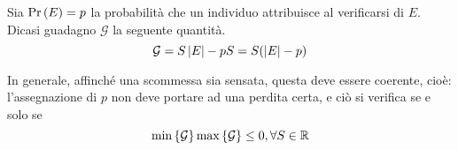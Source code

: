 \documentclass{subfiles}
\begin{document}
\begin{Definition*}
    Sia \(\Prob{E} = p\) la probabilità che un individuo attribuisce al verificarsi di \(E\).
    Dicasi guadagno \(\mathcal{G}\) la seguente quantità.
    \[
        \mathcal{G} = S \left\vert {E} \right\vert - pS = S(\left\vert {E} \right\vert - p)
    \]
\end{Definition*}
In generale, affinché una scommessa sia sensata, questa deve essere coerente, cioè:
l'assegnazione di \(p\) non deve portare ad una perdita certa, e ciò si verifica se e solo se
\[
    \Min*{\mathcal{G}} \Max*{\mathcal{G}} \le 0, \forall S \in \Real
\]
\end{document}
